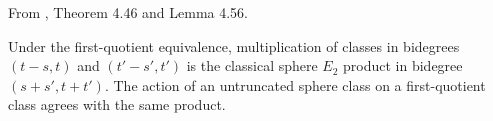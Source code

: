 \begin{proposition}
\label{sem:Literature:first-quotient-products}
From \cite{Pst}, Theorem 4.46 and Lemma 4.56.\par

Under the first-quotient equivalence, multiplication of classes in bidegrees $(t-s,t)$ and $(t'-s',t')$ is the classical sphere $E_2$ product in bidegree $(s+s',t+t')$. The action of an untruncated sphere class on a first-quotient class agrees with the same product.
\end{proposition}

